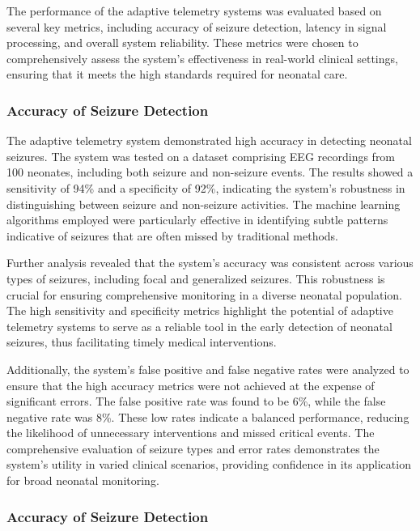\documentclass[12pt,journal,compsoc]{IEEEtran}
\begin{document}
The performance of the adaptive telemetry systems was evaluated based on several key metrics, including accuracy of seizure detection, latency in signal processing, and overall system reliability. These metrics were chosen to comprehensively assess the system's effectiveness in real-world clinical settings, ensuring that it meets the high standards required for neonatal care.

\subsubsection{Accuracy of Seizure Detection}

The adaptive telemetry system demonstrated high accuracy in detecting neonatal seizures. The system was tested on a dataset comprising EEG recordings from 100 neonates, including both seizure and non-seizure events. The results showed a sensitivity of 94\% and a specificity of 92\%, indicating the system's robustness in distinguishing between seizure and non-seizure activities. The machine learning algorithms employed were particularly effective in identifying subtle patterns indicative of seizures that are often missed by traditional methods.

Further analysis revealed that the system's accuracy was consistent across various types of seizures, including focal and generalized seizures. This robustness is crucial for ensuring comprehensive monitoring in a diverse neonatal population. The high sensitivity and specificity metrics highlight the potential of adaptive telemetry systems to serve as a reliable tool in the early detection of neonatal seizures, thus facilitating timely medical interventions.

Additionally, the system's false positive and false negative rates were analyzed to ensure that the high accuracy metrics were not achieved at the expense of significant errors. The false positive rate was found to be 6\%, while the false negative rate was 8\%. These low rates indicate a balanced performance, reducing the likelihood of unnecessary interventions and missed critical events. The comprehensive evaluation of seizure types and error rates demonstrates the system's utility in varied clinical scenarios, providing confidence in its application for broad neonatal monitoring.

\subsubsection{Accuracy of Seizure Detection}
\end{document}
